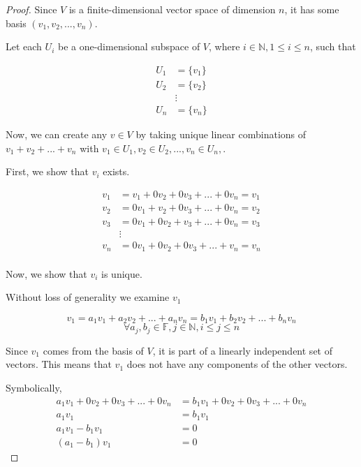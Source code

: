 \documentclass[12pt,letterpaper]{article}
\begin{document}
\begin{enumerate}
      \begin{proof}
        Since $V$ is a finite-dimensional vector space of dimension $n$,
        it has some basis $(v_1, v_2, ..., v_n)$.

        Let each $U_i$ be a one-dimensional subspace of $V$, where $i \in \mathbb{N}, 1 \le i \le n$, such that

        \begin{align*}
          U_1 &= \{v_1\} \\
          U_2 &= \{v_2\} \\
          &\vdots \\
          U_n &= \{v_n\}
        \end{align*}

        Now, we can create any $v \in V$ by taking unique linear combinations of $v_1 + v_2 + ... + v_n$ with $v_1 \in U_1, v_2 \in U_2, ..., v_n \in U_n,$.

        First, we show that $v_i$ exists.

        \begin{align*}
          v_1 &= v_1 + 0v_2 + 0v_3 + ... + 0v_n = v_1 \\
          v_2 &= 0v_1 + v_2 + 0v_3 + ... + 0v_n = v_2 \\
          v_3 &= 0v_1 + 0v_2 + v_3 + ... + 0v_n = v_3 \\
          & \vdots \\
          v_n &= 0v_1 + 0v_2 + 0v_3 + ... + v_n = v_n \\
        \end{align*}

        Now, we show that $v_i$ is unique.

        Without loss of generality we examine $v_1$

        \[v_1 = a_1v_1 + a_2v_2 + ... + a_nv_n = b_1v_1 + b_2v_2 + ... + b_nv_n\]
        \[\forall a_j, b_j \in \mathbb{F}, j \in \mathbb{N}, i \le j \le n\]
        
        Since $v_1$ comes from the basis of $V$, it is part of a linearly independent set of vectors.
        This means that $v_1$ does not have any components of the other vectors.

        Symbolically,
        \begin{align*}
          a_1v_1 + 0v_2 + 0v_3 + ... + 0v_n &= b_1v_1 + 0v_2 + 0v_3 + ... + 0v_n \\
          a_1v_1 &= b_1v_1 \\
          a_1v_1 - b_1v_1 &= 0 \\
          (a_1 - b_1)v_1 &= 0
        \end{align*}


\end{proof}
\end{enumerate}
\end{document}

